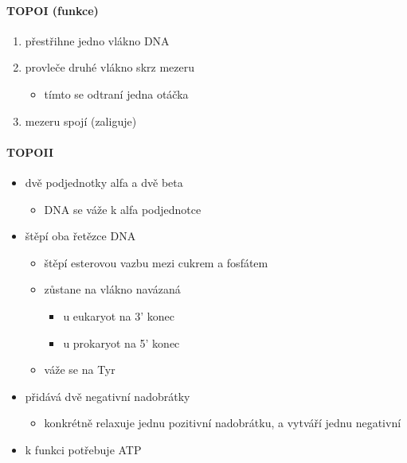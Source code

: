 \documentclass[DIV=8]{scrreprt}
\begin{document}
\paragraph{TOPOI (funkce)}
\begin{enumerate}[nosep]
    \item přestřihne jedno vlákno DNA
    \item provleče druhé vlákno skrz mezeru
\begin{itemize}[nosep]
    \item tímto se odtraní jedna otáčka
\end{itemize}

    \item mezeru spojí (zaliguje)
\end{enumerate}



\paragraph{TOPOII}
\begin{itemize}[nosep]
    \item dvě podjednotky alfa a dvě beta
\begin{itemize}[nosep]
    \item DNA se váže k alfa podjednotce
\end{itemize}

    \item štěpí oba řetězce DNA
\begin{itemize}[nosep]
    \item štěpí esterovou vazbu mezi cukrem a fosfátem
    \item zůstane na vlákno navázaná
\begin{itemize}[nosep]
    \item u eukaryot na 3' konec
    \item u prokaryot na 5' konec
\end{itemize}

    \item váže se na Tyr
\end{itemize}

    \item přidává dvě negativní nadobrátky
\begin{itemize}[nosep]
    \item konkrétně relaxuje jednu pozitivní nadobrátku, a vytváří jednu negativní
\end{itemize}

    \item k funkci potřebuje ATP
\end{itemize}
\end{document}
